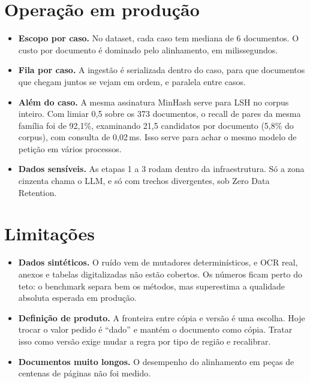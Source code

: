 \documentclass[11pt,a4paper]{article}
\begin{document}
\section{Operação em produção}

\begin{itemize}
  \item \textbf{Escopo por caso.} No dataset, cada caso tem mediana de 6 documentos. O custo por
    documento é dominado pelo alinhamento, em milissegundos.
  \item \textbf{Fila por caso.} A ingestão é serializada dentro do caso, para que documentos que
    chegam juntos se vejam em ordem, e paralela entre casos.
  \item \textbf{Além do caso.} A mesma assinatura MinHash serve para LSH no corpus inteiro. Com
    limiar 0,5 sobre os 373 documentos, o recall de pares da mesma família foi de 92,1\%,
    examinando 21,5 candidatos por documento (5,8\% do corpus), com consulta de 0,02\,ms. Isso
    serve para achar o mesmo modelo de petição em vários processos.
  \item \textbf{Dados sensíveis.} As etapas 1 a 3 rodam dentro da infraestrutura. Só a zona
    cinzenta chama o LLM, e só com trechos divergentes, sob Zero Data Retention.
\end{itemize}

\section{Limitações}

\begin{itemize}
  \item \textbf{Dados sintéticos.} O ruído vem de mutadores determinísticos, e OCR real, anexos e
    tabelas digitalizadas não estão cobertos. Os números ficam perto do teto: o benchmark separa
    bem os métodos, mas superestima a qualidade absoluta esperada em produção.
  \item \textbf{Definição de produto.} A fronteira entre cópia e versão é uma escolha. Hoje
    trocar o valor pedido é ``dado'' e mantém o documento como cópia. Tratar isso como versão
    exige mudar a regra por tipo de região e recalibrar.
  \item \textbf{Documentos muito longos.} O desempenho do alinhamento em peças de centenas de
    páginas não foi medido.
\end{itemize}
\end{document}
